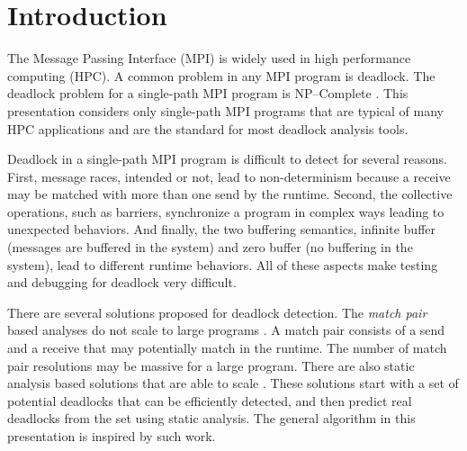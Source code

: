 \section{Introduction}

The Message Passing Interface (MPI) is widely used in high performance computing (HPC). A common problem in any MPI program is deadlock. The deadlock problem for a single-path MPI program is NP--Complete \cite{DBLP:conf/fm/ForejtKNS14}.
This presentation considers only single-path MPI programs that are typical of many HPC applications and are the standard for most deadlock analysis tools. 

Deadlock in a single-path MPI program is difficult to detect for several reasons. First, message races, intended or not, lead to non-determinism because a receive may be matched with more than one send by the runtime. Second, the collective operations, such as barriers, synchronize a program in complex ways leading to unexpected behaviors. And finally, the two buffering semantics, infinite buffer (messages are buffered in the system) and zero buffer (no buffering in the system), lead to different runtime behaviors. All of these aspects make testing and debugging for deadlock very difficult. 

There are several solutions proposed for deadlock detection. The \emph{match pair} based analyses do not scale to large programs \cite{DBLP:conf/ppopp/VakkalankaSGK08, DBLP:conf/sbmf/SharmaGB12, DBLP:conf/fm/ForejtKNS14}. A match pair consists of a send and a receive that may potentially match in the runtime. The number of match pair resolutions may be massive for a large program.
There are also static analysis based solutions that are able to scale \cite{DBLP:conf/sc/SharmaGB12, DBLP:conf/pldi/JoshiPSN09, Subodh:Dissertation}. These solutions start with a set of potential deadlocks that can be efficiently detected, and then predict real deadlocks from the set using static analysis.
The general algorithm in this presentation is inspired by such work.

